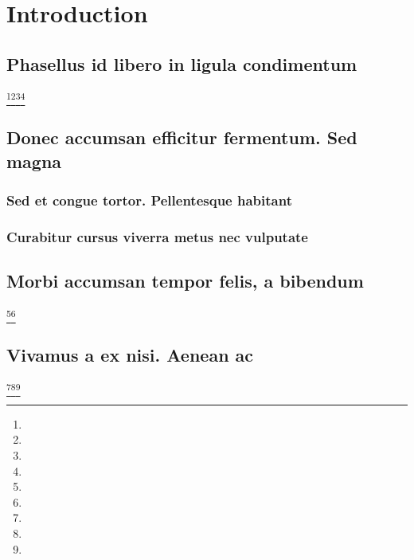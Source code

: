 \documentclass[%
  german,%
  exercise,%
  oneside,%
]{iswartcl}
\begin{document}
\tableofcontents

\listoffigures

\listoftables

\printglossary[type=\acronymtype]


\listoftodos

\mainmatter


\chapter{Introduction}

\section{Phasellus id libero in ligula condimentum}

\lipsum[1-8]\footnote{\lipsum[1]}\footnote{\lipsum[1]}\footnote{\lipsum[1]}\footnote{\lipsum[1]}

\section{Donec accumsan efficitur fermentum. Sed magna}

\lipsum[1-8]

\subsection{Sed et congue tortor. Pellentesque habitant}

\lipsum[1-8]

\subsection{Curabitur cursus viverra metus nec vulputate}

\lipsum[1-8]

\section{Morbi accumsan tempor felis, a bibendum}

\lipsum[1-8]\footnote{\lipsum[1]}\footnote{\lipsum[1]}

\section{Vivamus a ex nisi. Aenean ac}

\lipsum[1-8]\footnote{\lipsum[1]}\footnote{\lipsum[1]}\footnote{\lipsum[1]}
\end{document}
